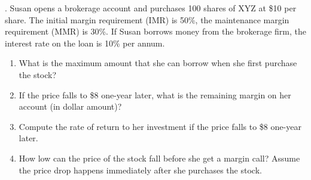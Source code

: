 \documentclass[11.5pt]{article}
\begin{document}
%
%
%
%



\vspace{40pt}



. Susan opens a brokerage account and purchases 100 shares of XYZ at \$10 per share.  The initial margin requirement (IMR) is 50\%, the maintenance margin requirement (MMR) is 30\%.  If Susan borrows money from the brokerage firm, the interest rate on the loan is 10\% per annum.  

\begin{enumerate}[a]
\item What is the maximum amount that she can borrow when she first purchase the stock?

\item If the price falls to \$8 one-year later, what is the remaining margin on her account (in dollar amount)?

\item Compute the rate of return to her investment if the price falls to \$8 one-year later.

\item How low can the price of the stock fall before she get a margin call?  Assume the price drop happens immediately after she purchases the stock. 

\end{enumerate}
\end{document}
